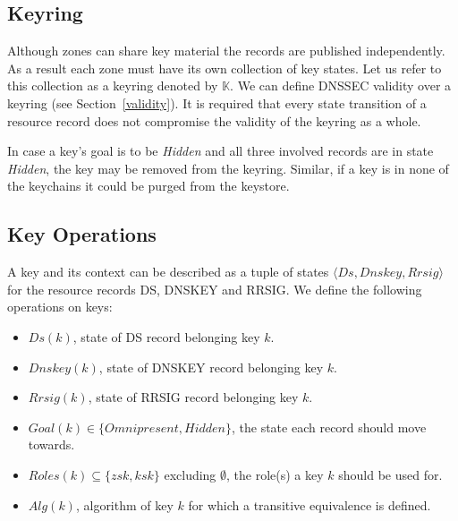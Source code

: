 \documentclass[twoside,english, a4paper]{article}
\begin{document}
\subsection{Keyring}

Although zones can share key material the records are published 
independently. As a result each zone must have its own collection of
key states. Let us refer to this collection as a keyring denoted 
by $\mathbb{K}$. We can
define DNSSEC validity over a keyring (see Section~\ref{validity}).
It is required that every state transition of a resource record does 
not compromise the validity of the keyring as a whole.

In case a key's goal is to be \emph{Hidden} and all three involved
records are in state \emph{Hidden}, the key may be removed from the
keyring. Similar, if a key is in none of the keychains it could be
purged from the keystore.

\subsection{Key Operations}

A key and its context can be described as a tuple of states $\langle 
Ds,Dnskey,Rrsig\rangle$ for the resource records DS, DNSKEY and RRSIG.
We define the following operations on keys:

\begin{itemize}
	\item $Ds(k)$, state of DS record belonging key $k$.
	\item $Dnskey(k)$, state of DNSKEY record belonging key $k$.
	\item $Rrsig(k)$, state of RRSIG record belonging key $k$.
	\item $Goal(k) \in \{Omnipresent, Hidden\}$, the state each record
		should move towards.
	\item $Roles(k) \subseteq \{zsk,ksk\}$ excluding $\emptyset$, the 
		role(s) a key $k$ should be used for.
	\item $Alg(k)$, algorithm of key $k$ for which a transitive equivalence
		is defined.
\end{itemize}
\end{document}

